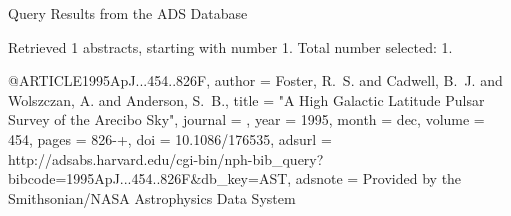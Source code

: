 Query Results from the ADS Database


Retrieved 1 abstracts, starting with number 1.  Total number selected: 1.

@ARTICLE{1995ApJ...454..826F,
   author = {{Foster}, R.~S. and {Cadwell}, B.~J. and {Wolszczan}, A. and 
	{Anderson}, S.~B.},
    title = "{A High Galactic Latitude Pulsar Survey of the Arecibo Sky}",
  journal = {\apj},
     year = 1995,
    month = dec,
   volume = 454,
    pages = {826-+},
      doi = {10.1086/176535},
   adsurl = {http://adsabs.harvard.edu/cgi-bin/nph-bib_query?bibcode=1995ApJ...454..826F&db_key=AST},
  adsnote = {Provided by the Smithsonian/NASA Astrophysics Data System}
}


